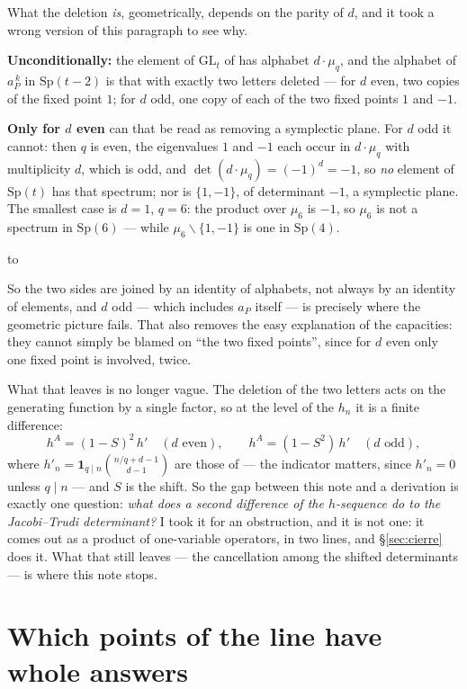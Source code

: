 \documentclass[11pt,a4paper]{article}
\theoremstyle{definition}
\newcommand{\Sp}{\mathrm{Sp}}
\newcommand{\GL}{\mathrm{GL}}
\newenvironment{keybox}
  {\par\vspace{9pt}\begin{lrbox}{\fichabox}%
   \begin{minipage}{0.90\textwidth}\vspace{7pt}\setlength{\parskip}{3pt}}
  {\vspace{7pt}\end{minipage}\end{lrbox}%
   \par\noindent\hbox to \textwidth{\hfill
   \textcolor{azul}{\rule[-\dp\fichabox]{3.2pt}{\dimexpr\ht\fichabox+\dp\fichabox\relax}}%
   \colorbox{fondoficha}{\usebox{\fichabox}}\hfill}%
   \par\vspace{9pt}}
\begin{document}
\noindent What the deletion \emph{is}, geometrically, depends on the parity of $d$, and it took a
wrong version of this paragraph to see why.

\begin{keybox}
\textbf{Unconditionally:} the element of $\GL_t$ of \cite{Prasad16b} has alphabet $d\cdot\mu_q$, and the alphabet of
$a_P^{\,k}$ in $\Sp(t-2)$ is that with exactly two letters deleted --- for $d$ even, two copies of
the fixed point $1$; for $d$ odd, one copy of each of the two fixed points $1$ and $-1$.

\smallskip
\textbf{Only for $d$ even} can that be read as removing a symplectic plane. For $d$ odd it cannot:
then $q$ is even, the eigenvalues $1$ and $-1$ each occur in $d\cdot\mu_q$ with multiplicity $d$,
which is odd, and $\det(d\cdot\mu_q)=(-1)^{d}=-1$, so \emph{no} element of $\Sp(t)$ has that
spectrum; nor is $\{1,-1\}$, of determinant $-1$, a symplectic plane. The smallest case is $d=1$,
$q=6$: the product over $\mu_6$ is $-1$, so $\mu_6$ is not a spectrum in $\Sp(6)$ --- while
$\mu_6\smallsetminus\{1,-1\}$ is one in $\Sp(4)$.
\end{keybox}

\noindent So the two sides are joined by an identity of alphabets, not always by an identity of
elements, and $d$ odd --- which includes $a_P$ itself --- is precisely where the geometric picture
fails. That also removes the easy explanation of the capacities: they cannot simply be blamed on
``the two fixed points'', since for $d$ even only one fixed point is involved, twice.

What that leaves is no longer vague. The deletion of the two letters acts on the
generating function by a single factor, so at the level of the $h_n$ it is a finite difference:
\[
h^{A} = (1-S)^2\,h' \quad (d \text{ even}), \qquad h^{A} = (1-S^2)\,h' \quad (d \text{ odd}),
\]
where $h'_n=\mathbf{1}_{q\mid n}\binom{n/q+d-1}{d-1}$ are those of \cite{Prasad16b} --- the indicator matters, since $h'_n=0$ unless $q\mid n$ --- and $S$ is the shift. So the gap between this note and a
derivation is exactly one question: \emph{what does a second difference of the $h$-sequence do to the
Jacobi--Trudi determinant?} I took it for an obstruction, and it is not one: it comes out as a
product of one-variable operators, in two lines, and \S\ref{sec:cierre} does it. What that still
leaves --- the cancellation among the shifted determinants --- is where this note stops.


\section{Which points of the line have whole answers}\label{sec:clasif}
\end{document}
